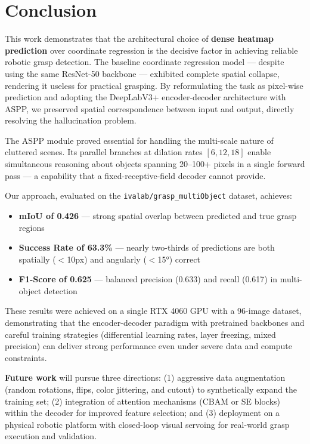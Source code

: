 \documentclass[12pt, a4paper]{article}
\begin{document}
\section{Conclusion}
\label{sec:conclusion}

This work demonstrates that the architectural choice of \textbf{dense heatmap prediction} over coordinate regression is the decisive factor in achieving reliable robotic grasp detection. The baseline coordinate regression model — despite using the same ResNet-50 backbone — exhibited complete spatial collapse, rendering it useless for practical grasping. By reformulating the task as pixel-wise prediction and adopting the DeepLabV3+ encoder-decoder architecture with ASPP, we preserved spatial correspondence between input and output, directly resolving the hallucination problem.

The ASPP module proved essential for handling the multi-scale nature of cluttered scenes. Its parallel branches at dilation rates $[6, 12, 18]$ enable simultaneous reasoning about objects spanning 20--100+ pixels in a single forward pass — a capability that a fixed-receptive-field decoder cannot provide.

Our approach, evaluated on the \texttt{ivalab/grasp\_multiObject} dataset, achieves:
\begin{itemize}[leftmargin=2em]
    \item \textbf{mIoU of 0.426} — strong spatial overlap between predicted and true grasp regions
    \item \textbf{Success Rate of 63.3\%} — nearly two-thirds of predictions are both spatially ($<$10px) and angularly ($<$15$°$) correct
    \item \textbf{F1-Score of 0.625} — balanced precision (0.633) and recall (0.617) in multi-object detection
\end{itemize}

These results were achieved on a single RTX 4060 GPU with a 96-image dataset, demonstrating that the encoder-decoder paradigm with pretrained backbones and careful training strategies (differential learning rates, layer freezing, mixed precision) can deliver strong performance even under severe data and compute constraints.

\textbf{Future work} will pursue three directions: (1) aggressive data augmentation (random rotations, flips, color jittering, and cutout) to synthetically expand the training set; (2) integration of attention mechanisms (CBAM or SE blocks) within the decoder for improved feature selection; and (3) deployment on a physical robotic platform with closed-loop visual servoing for real-world grasp execution and validation.
\end{document}
